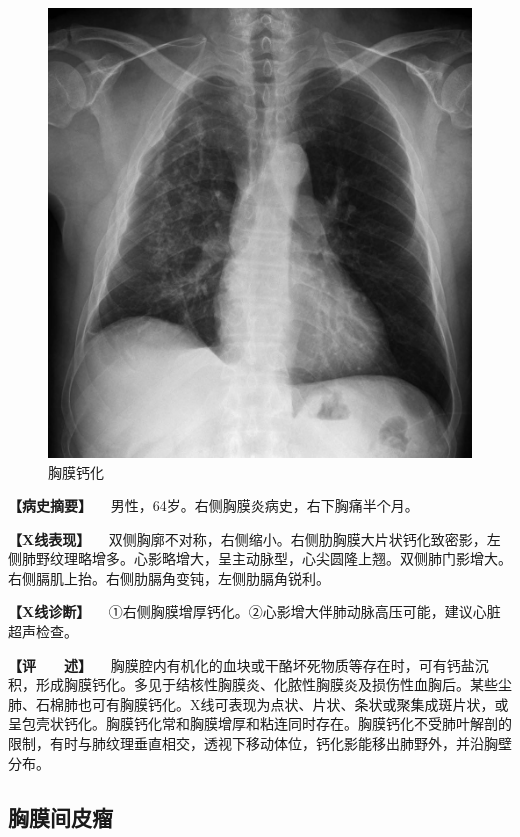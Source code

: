 \begin{figure}[!htbp]
 \centering
 \includegraphics{./images/Image00192.jpg}
 \captionsetup{justification=centering}
 \caption{胸膜钙化}
 \label{fig3-11-6}
  \end{figure} 

\textbf{【病史摘要】} 　男性，64岁。右侧胸膜炎病史，右下胸痛半个月。

\textbf{【X线表现】}
　双侧胸廓不对称，右侧缩小。右侧肋胸膜大片状钙化致密影，左侧肺野纹理略增多。心影略增大，呈主动脉型，心尖圆隆上翘。双侧肺门影增大。右侧膈肌上抬。右侧肋膈角变钝，左侧肋膈角锐利。

\textbf{【X线诊断】}
　①右侧胸膜增厚钙化。②心影增大伴肺动脉高压可能，建议心脏超声检查。

\textbf{【评　　述】}
　胸膜腔内有机化的血块或干酪坏死物质等存在时，可有钙盐沉积，形成胸膜钙化。多见于结核性胸膜炎、化脓性胸膜炎及损伤性血胸后。某些尘肺、石棉肺也可有胸膜钙化。X线可表现为点状、片状、条状或聚集成斑片状，或呈包壳状钙化。胸膜钙化常和胸膜增厚和粘连同时存在。胸膜钙化不受肺叶解剖的限制，有时与肺纹理垂直相交，透视下移动体位，钙化影能移出肺野外，并沿胸壁分布。

\subsection{胸膜间皮瘤}

